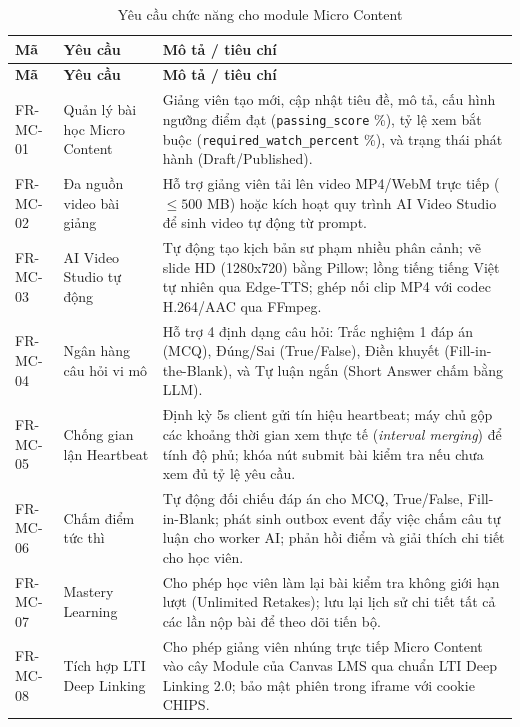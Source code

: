 \begin{longtable}{|p{2.4cm}|p{5.1cm}|p{6.9cm}|}
\caption{Yêu cầu chức năng cho module Micro Content}
\label{tab:fr-micro-content}\\
\hline
\textbf{Mã} & \textbf{Yêu cầu} & \textbf{Mô tả / tiêu chí} \\
\hline
\endfirsthead
\hline
\textbf{Mã} & \textbf{Yêu cầu} & \textbf{Mô tả / tiêu chí} \\
\hline
\endhead
FR-MC-01 & Quản lý bài học Micro Content & Giảng viên tạo mới, cập nhật tiêu đề, mô tả, cấu hình ngưỡng điểm đạt (\texttt{passing\_score} \%), tỷ lệ xem bắt buộc (\texttt{required\_watch\_percent} \%), và trạng thái phát hành (Draft/Published). \\
\hline
FR-MC-02 & Đa nguồn video bài giảng & Hỗ trợ giảng viên tải lên video MP4/WebM trực tiếp ($\leq 500$ MB) hoặc kích hoạt quy trình AI Video Studio để sinh video tự động từ prompt. \\
\hline
FR-MC-03 & AI Video Studio tự động & Tự động tạo kịch bản sư phạm nhiều phân cảnh; vẽ slide HD (1280x720) bằng Pillow; lồng tiếng tiếng Việt tự nhiên qua Edge-TTS; ghép nối clip MP4 với codec H.264/AAC qua FFmpeg. \\
\hline
FR-MC-04 & Ngân hàng câu hỏi vi mô & Hỗ trợ 4 định dạng câu hỏi: Trắc nghiệm 1 đáp án (MCQ), Đúng/Sai (True/False), Điền khuyết (Fill-in-the-Blank), và Tự luận ngắn (Short Answer chấm bằng LLM). \\
\hline
FR-MC-05 & Chống gian lận Heartbeat & Định kỳ 5s client gửi tín hiệu heartbeat; máy chủ gộp các khoảng thời gian xem thực tế (\textit{interval merging}) để tính độ phủ; khóa nút submit bài kiểm tra nếu chưa xem đủ tỷ lệ yêu cầu. \\
\hline
FR-MC-06 & Chấm điểm tức thì & Tự động đối chiếu đáp án cho MCQ, True/False, Fill-in-Blank; phát sinh outbox event đẩy việc chấm câu tự luận cho worker AI; phản hồi điểm và giải thích chi tiết cho học viên. \\
\hline
FR-MC-07 & Mastery Learning & Cho phép học viên làm lại bài kiểm tra không giới hạn lượt (Unlimited Retakes); lưu lại lịch sử chi tiết tất cả các lần nộp bài để theo dõi tiến bộ. \\
\hline
FR-MC-08 & Tích hợp LTI Deep Linking & Cho phép giảng viên nhúng trực tiếp Micro Content vào cây Module của Canvas LMS qua chuẩn LTI Deep Linking 2.0; bảo mật phiên trong iframe với cookie CHIPS. \\
\hline
\end{longtable}

